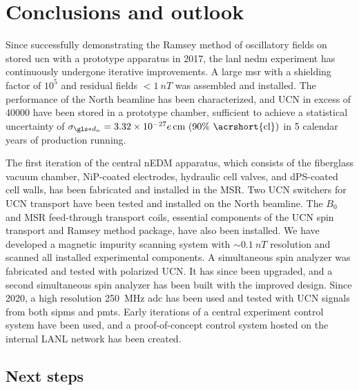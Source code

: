 
\chapter{Conclusions and outlook}\label{chap:conclusion}


Since successfully demonstrating the Ramsey method of oscillatory fields on stored \acrshort{ucn} with a prototype apparatus in 2017, the \acrshort{lanl} \acrshort{nedm} experiment has continuously undergone iterative improvements. A large \acrshort{msr} with a shielding factor of $10^5$ and residual fields $<\qty{1}{nT}$ was assembled and installed. The performance of the North beamline has been characterized, and UCN in excess of \num{40000} have been stored in a prototype chamber, sufficient to achieve a statistical uncertainty of $\sigma_{\gls*{d_n}}=\num{3.32e-27}e\,\text{cm (90\% \acrshort{cl})}$ in 5 calendar years of production running.

The first iteration of the central nEDM apparatus, which consists of the fiberglass vacuum chamber, NiP-coated electrodes, hydraulic cell valves, and dPS-coated cell walls, has been fabricated and installed in the MSR. Two UCN switchers for UCN transport have been tested and installed on the North beamline. The $B_0$ and MSR feed-through transport coils, essential components of the UCN spin transport and Ramsey method package, have also been installed. We have developed a magnetic impurity scanning system with $\sim \qty{0.1}{nT}$ resolution and scanned all installed experimental components. A simultaneous spin analyzer was fabricated and tested with polarized UCN. It has since been upgraded, and a second simultaneous spin analyzer has been built with the improved design. Since 2020, a high resolution \qty{250}{MHz} \acrshort{adc} has been used and tested with UCN signals from both \acrshort{sipm}s and \acrshort{pmt}s. Early iterations of a central experiment control system have been used, and a proof-of-concept control system hosted on the internal LANL network has been created.


\section{Next steps}


